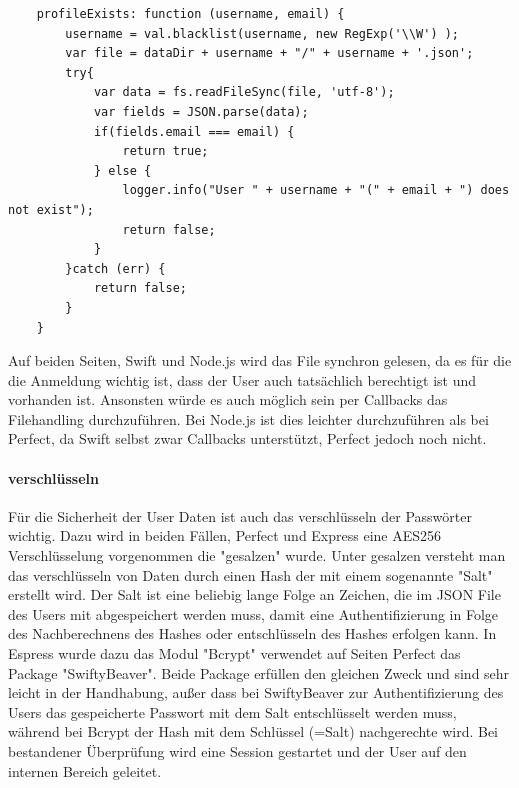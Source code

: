 
\begin{lstlisting}
    profileExists: function (username, email) {
		username = val.blacklist(username, new RegExp('\\W') );
        var file = dataDir + username + "/" + username + '.json';
        try{
            var data = fs.readFileSync(file, 'utf-8');
            var fields = JSON.parse(data);
            if(fields.email === email) {
                return true;
            } else {
				logger.info("User " + username + "(" + email + ") does not exist");
                return false;
            }
        }catch (err) {
            return false;
        }
    }
\end{lstlisting}

Auf beiden Seiten, Swift und Node.js wird das File synchron gelesen, da es für die die Anmeldung wichtig ist, dass der User auch tatsächlich berechtigt ist und vorhanden ist. Ansonsten würde es auch möglich sein per Callbacks das Filehandling durchzuführen. Bei Node.js ist dies leichter durchzuführen als bei Perfect, da Swift selbst zwar Callbacks unterstützt, Perfect jedoch noch nicht. 

\paragraph{verschlüsseln}
Für die Sicherheit der User Daten ist auch das verschlüsseln der Passwörter wichtig. Dazu wird in beiden Fällen, Perfect und Express eine AES256 Verschlüsselung vorgenommen die "gesalzen" wurde. Unter gesalzen versteht man das verschlüsseln von Daten durch einen Hash der mit einem sogenannte "Salt" erstellt wird. Der Salt ist eine beliebig lange Folge an Zeichen, die im JSON File des Users mit abgespeichert werden muss, damit eine Authentifizierung in Folge des Nachberechnens des Hashes oder entschlüsseln des Hashes erfolgen kann. 
In Espress wurde dazu das Modul "Bcrypt" verwendet auf Seiten Perfect das Package "SwiftyBeaver". Beide Package erfüllen den gleichen Zweck und sind sehr leicht in der Handhabung, außer dass bei SwiftyBeaver zur Authentifizierung des Users das gespeicherte Passwort mit dem Salt entschlüsselt werden muss, während bei Bcrypt der Hash mit dem Schlüssel (=Salt) nachgerechte wird. Bei bestandener Überprüfung wird eine Session gestartet und der User auf den internen Bereich geleitet.


